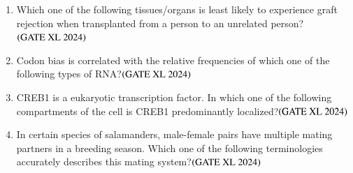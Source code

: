 \documentclass[journal]{IEEEtran}
\begin{document}
\begin{enumerate}
    \item Which one of the following tissues/organs is least likely to experience graft rejection when transplanted from a person to an unrelated person?\hfill $\left(\text{GATE XL 2024}\right)$
    \begin{enumerate}
    \end{enumerate}

    \item Codon bias is correlated with the relative frequencies of which one of the following types of RNA?\hfill $\left(\text{GATE XL 2024}\right)$
    \begin{enumerate}
    \end{enumerate}

    \item CREB1 is a eukaryotic transcription factor. In which one of the following compartments of the cell is CREB1 predominantly localized?\hfill $\left(\text{GATE XL 2024}\right)$
    \begin{enumerate}
    \end{enumerate}

    \item In certain species of salamanders, male-female pairs have multiple mating partners in a breeding season. Which one of the following terminologies accurately describes this mating system?\hfill $\left(\text{GATE XL 2024}\right)$
    \begin{enumerate}
    \end{enumerate}


\end{enumerate}
\end{document}
